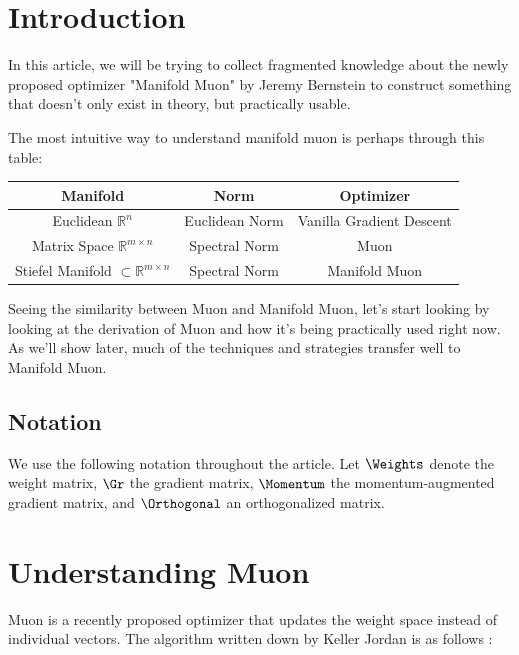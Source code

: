 \documentclass[12pt]{article}
\begin{document}
	\MakeScribeTop

\section{Introduction}

In this article, we will be trying to collect fragmented knowledge about the newly proposed optimizer "Manifold Muon" by Jeremy Bernstein \cite{bernstein2025manifolds} to construct something that doesn't only exist in theory, but practically usable. 

The most intuitive way to understand manifold muon is perhaps through this table: 

\medskip

\begin{center}
\begin{tabular}{|c|c|c|}
\hline
Manifold & Norm & Optimizer \\
\hline \hline
Euclidean $\mathbb{R}^n$ & Euclidean Norm & Vanilla Gradient Descent \\ \hline
Matrix Space $\mathbb{R}^{m \times n}$ & Spectral Norm & Muon \\ \hline
Stiefel Manifold $\subset \mathbb{R}^{m \times n}$ & Spectral Norm & Manifold Muon \\ \hline
\end{tabular}
\end{center}

Seeing the similarity between Muon and Manifold Muon, let's start looking by looking at the derivation of Muon and how it's being practically used right now. As we'll show later, much of the techniques and strategies transfer well to Manifold Muon.

\subsection{Notation}

We use the following notation throughout the article.
Let $\Weights$ denote the weight matrix,
$\Gr$ the gradient matrix,
$\Momentum$ the momentum-augmented gradient matrix,
and $\Orthogonal$ an orthogonalized matrix.


\section{Understanding Muon}
Muon is a recently proposed optimizer that updates the weight space instead of individual vectors. The algorithm written down by Keller Jordan is as follows \cite{jordan2024muon}:
\end{document}
